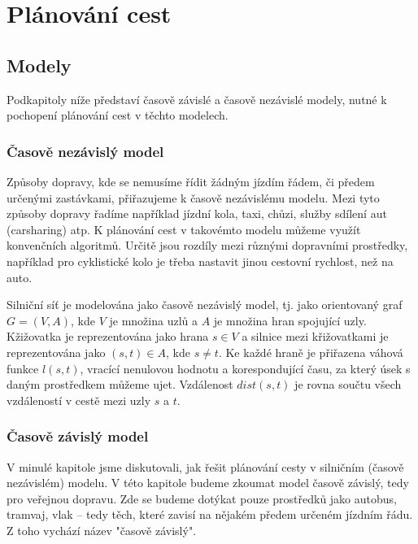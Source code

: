 \documentclass[thesis=M,czech]{FITthesis}[2019/12/23]
\theoremstyle{plain}
\theoremstyle{definition}
\begin{document}
\section{Plánování cest}



\subsection{Modely}

Podkapitoly níže představí časově závislé a časově nezávislé modely, nutné k pochopení plánování cest v těchto modelech.

\subsubsection{Časově nezávislý model}

Způsoby dopravy, kde se nemusíme řídit žádným jízdím řádem, či předem určenými zastávkami, přiřazujeme k časově nezávislému modelu. Mezi tyto způsoby dopravy řadíme například jízdní kola, taxi, chůzi, služby sdílení aut (carsharing) atp. K plánování cest v takovémto modelu můžeme využít konvenčních algoritmů. Určitě jsou rozdíly mezi různými dopravními prostředky, například  pro cyklistické kolo je třeba nastavit jinou cestovní rychlost, než na auto. 


Silniční síť je modelována jako časově nezávislý model, tj. jako orientovaný graf $G = (V, A)$, kde $V$ je množina uzlů a $A$ je množina hran spojující uzly. Kžižovatka je reprezentována jako hrana $ s \in V $ a silnice mezi křižovatkami je reprezentována jako  $ (s, t) \in A $, kde $s \neq t $. Ke každé hraně je přiřazena váhová funkce $l(s, t)$, vracící nenulovou hodnotu a korespondující času, za který úsek s daným prostředkem můžeme ujet. Vzdálenost $dist(s,t)$ je rovna součtu všech vzdáleností v cestě mezi uzly $s$ a $t$. \cite{multimodal-route-planning}



\subsubsection{Časově závislý model}

V minulé kapitole jsme diskutovali, jak řešit plánování cesty v silničním (časově nezávislém) modelu. V této kapitole budeme zkoumat model časově závislý, tedy pro veřejnou dopravu. Zde se budeme dotýkat pouze prostředků jako autobus, tramvaj, vlak -- tedy těch, které zavisí na nějakém předem určeném jízdním řádu. Z toho vychází název "časově závislý".
\end{document}
